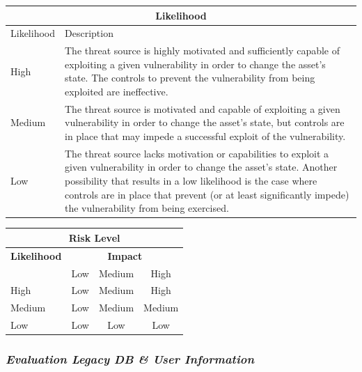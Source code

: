 \documentclass{article}
\begin{document}
\begin{center}
\begin{tabular}{|l|p{10cm}|}
\hline
\multicolumn{2}{|c|}{\bf Likelihood} \\
\hline
Likelihood & Description \\
\hline
\hline
High   & \hspace*{20pt}
The threat source is highly motivated and sufficiently capable of exploiting a given vulnerability in order to change the asset's state. The controls to prevent the vulnerability from being exploited are ineffective. \\
\hline
Medium & \hspace*{20pt}
The threat source is motivated and capable of exploiting a given vulnerability in order to change the asset's state, but controls are in place that may impede a successful exploit of the vulnerability. \\
\hline
Low   & \hspace*{20pt}
The threat source lacks motivation or capabilities to exploit a given vulnerability in order to change the asset's state. Another possibility that results in a low likelihood is the case where controls are in place that prevent (or at least significantly impede) the vulnerability from being exercised. \\
\hline
\end{tabular}
\end{center}

\vspace{5mm}

\begin{center}
\begin{tabular}{|l|c|c|c|}
\hline
\multicolumn{4}{|c|}{{\bf Risk Level}} \\
\hline
{{\bf Likelihood}} & \multicolumn{3}{c|}{{\bf Impact}} \\ %
     & Low & Medium & High \\  \hline
 High & Low & Medium & High  \\
\hline
 Medium & Low & Medium & Medium \\
\hline
 Low & Low & Low & Low \\
\hline
\end{tabular}
\end{center}

\subsubsection{{\it Evaluation Legacy DB \& User Information}}
\end{document}
